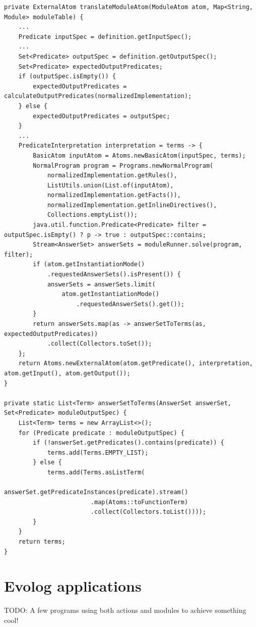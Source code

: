 \begin{lstlisting}[style=java, label={lst:module-interpretation-impl}, caption={Constructing module interpretations}]
private ExternalAtom translateModuleAtom(ModuleAtom atom, Map<String, Module> moduleTable) {
    ...
    Predicate inputSpec = definition.getInputSpec();
    ...
    Set<Predicate> outputSpec = definition.getOutputSpec();
    Set<Predicate> expectedOutputPredicates;
    if (outputSpec.isEmpty()) {
    	expectedOutputPredicates = calculateOutputPredicates(normalizedImplementation);
    } else {
    	expectedOutputPredicates = outputSpec;
    }
    ...
    PredicateInterpretation interpretation = terms -> {
    	BasicAtom inputAtom = Atoms.newBasicAtom(inputSpec, terms);
    	NormalProgram program = Programs.newNormalProgram(
            normalizedImplementation.getRules(),
    		ListUtils.union(List.of(inputAtom), 
            normalizedImplementation.getFacts()), 
            normalizedImplementation.getInlineDirectives(), 
            Collections.emptyList());
    	java.util.function.Predicate<Predicate> filter = outputSpec.isEmpty() ? p -> true : outputSpec::contains;
    	Stream<AnswerSet> answerSets = moduleRunner.solve(program, filter);
    	if (atom.getInstantiationMode()
            .requestedAnswerSets().isPresent()) {
    		answerSets = answerSets.limit(
                atom.getInstantiationMode()
                    .requestedAnswerSets().get());
    	}
    	return answerSets.map(as -> answerSetToTerms(as, expectedOutputPredicates))
            .collect(Collectors.toSet());
    };
    return Atoms.newExternalAtom(atom.getPredicate(), interpretation, atom.getInput(), atom.getOutput());
}

private static List<Term> answerSetToTerms(AnswerSet answerSet, Set<Predicate> moduleOutputSpec) {
    List<Term> terms = new ArrayList<>();
    for (Predicate predicate : moduleOutputSpec) {
        if (!answerSet.getPredicates().contains(predicate)) {
            terms.add(Terms.EMPTY_LIST);
        } else {
            terms.add(Terms.asListTerm(
                    answerSet.getPredicateInstances(predicate).stream()
                        .map(Atoms::toFunctionTerm)
                        .collect(Collectors.toList())));
        }
    }
    return terms;
}
\end{lstlisting}    



\section{Evolog applications}

TODO: A few programs using both actions and modules to achieve something cool!
